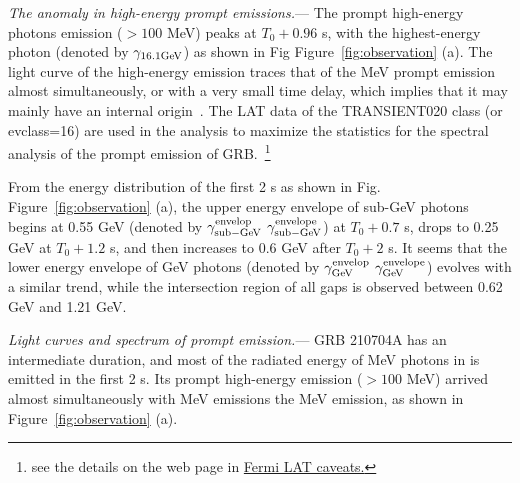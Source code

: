 \documentclass[linenumbers,twocolumn]{aastex631}
\providecommand{\DIFaddtex}[1]{{\protect\color{blue} \sf #1}} %
\providecommand{\DIFdeltex}[1]{{\protect\color{red} \scriptsize #1}} %
\providecommand{\DIFaddbegin}{} %
\providecommand{\DIFaddend}{} %
\providecommand{\DIFdelbegin}{} %
\providecommand{\DIFdelend}{} %
\providecommand{\DIFadd}[1]{\texorpdfstring{\DIFaddtex{#1}}{#1}} %
\providecommand{\DIFdel}[1]{\texorpdfstring{\DIFdeltex{#1}}{}} %
\begin{document}
\textit{The anomaly in high-energy prompt emissions.}--- The prompt high-energy \DIFdelbegin \DIFdel{photons }\DIFdelend \DIFaddbegin \DIFadd{emission }\DIFaddend ($>100$ MeV) peaks at $T_0+0.96$ s, with the highest-energy photon (denoted by $\gamma_{16.1 \rm GeV}$) as shown in \DIFdelbegin \DIFdel{Fig}\DIFdelend \DIFaddbegin \DIFadd{Figure}\DIFaddend ~\ref{fig:observation} (a). The light curve of the high-energy emission traces that of the MeV prompt emission almost simultaneously, or with a very small time delay, which implies that it may mainly have an internal
origin~\citep{2011MNRAS.415...77M,2012MNRAS.420..468P}. The LAT data of the TRANSIENT020 class (or evclass=16) are used in the analysis to maximize the statistics for the spectral analysis of the prompt emission of GRB.~\footnote{see the details on the web page in \href{https://fermi.gsfc.nasa.gov/ssc/data/analysis/LAT_caveats.html}{Fermi LAT caveats.}} 

From the energy distribution of the first 2 s as shown in \DIFdelbegin \DIFdel{Fig.}\DIFdelend \DIFaddbegin \DIFadd{Figure}\DIFaddend ~\ref{fig:observation} (a), the upper energy envelope of sub-GeV photons begins at 0.55 GeV (denoted by
\DIFdelbegin \DIFdel{$\gamma^{\rm envelop}_{\rm  sub-GeV}$}\DIFdelend \DIFaddbegin \DIFadd{$\gamma^{\rm envelope}_{\rm sub-GeV}$}\DIFaddend ) at $T_0+0.7$ s, drops to 0.25 GeV at $T_0+1.2$ s, and then increases to 0.6 GeV after $T_0+2$ s. It seems that the lower energy envelope of GeV photons (denoted by \DIFdelbegin \DIFdel{$\gamma^{\rm envelop}_{\rm GeV}$}\DIFdelend \DIFaddbegin \DIFadd{$\gamma^{\rm envelope}_{\rm GeV}$}\DIFaddend ) evolves with a similar trend, while the intersection region of all gaps is observed between 0.62 GeV and 1.21 GeV.

\textit{Light curves and spectrum of prompt emission.}---
GRB 210704A has an intermediate duration, and most of the radiated energy of MeV photons \DIFdelbegin \DIFdel{in }\DIFdelend is emitted in the first 2 s. Its prompt high-energy emission ($>100$ MeV) arrived almost simultaneously with \DIFdelbegin \DIFdel{MeV emissions}\DIFdelend \DIFaddbegin \DIFadd{the MeV emission}\DIFaddend , as shown in Figure~\ref{fig:observation} (a).
\end{document}
